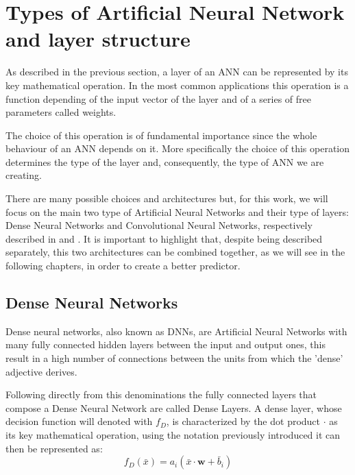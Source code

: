 

 

\section{Types of Artificial Neural Network and layer structure}
\label{ANN_type}

As described in the previous section, a layer of an ANN can be represented by its key mathematical operation. In the most common applications this operation is a function depending of the input vector of the layer and of a series of free parameters called weights.

The choice of this operation is of fundamental importance since the whole behaviour of an ANN depends on it. More specifically the choice of this operation determines the type of the layer and, consequently, the type of ANN we are creating. 

There are many possible choices and architectures but, for this work, we will focus on the main two type of Artificial Neural Networks and their type of layers: Dense Neural Networks and Convolutional Neural Networks, respectively described in  and .
It is important to highlight that, despite being described separately, this two architectures can be combined together, as we will see in the following chapters, in order to create a better predictor.

\subsection{Dense Neural Networks}\label{dnn}

Dense neural networks, also known as DNNs, are Artificial Neural Networks with many fully connected hidden layers between the input and output ones, this result in a high number of connections between the units from which the 'dense' adjective derives.

Following directly from this denominations the fully connected layers that compose a Dense Neural Network are called Dense Layers.
A dense layer, whose decision function will denoted with $f_D$, is characterized by the dot product $\cdot$ as its key mathematical operation, using the notation previously introduced it can then be represented as:
\begin{equation}
    f_D (\bar{x})=a_i \left( \bar{x} \cdot \boldsymbol{w} + \bar{b}_i \right) 
    \label{eq:layer_dense}
\end{equation}


